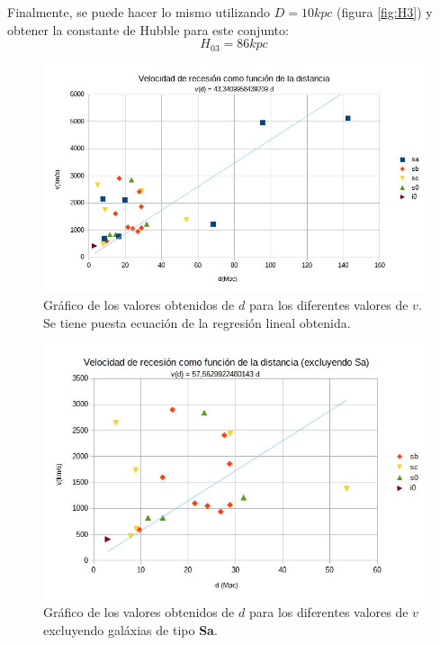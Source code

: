 \documentclass[a4paper,12pt]{article}
\begin{document}
Finalmente, se puede hacer lo mismo utilizando $D=10kpc$ (figura \ref{fig:H3}) y obtener la constante de Hubble para
este conjunto:
$$H_{03} = 86 kpc$$

\begin{figure}[H]
    \includegraphics[width=\textwidth]{g1.jpg}
    \caption{Gráfico de los valores obtenidos de $d$ para los diferentes valores de $v$. Se tiene puesta ecuación de la regresión lineal obtenida.}    
    \label{fig:H1}
\end{figure}

\begin{figure}[H]
    \includegraphics[width=\textwidth]{g2.jpg} 
    \caption{Gráfico de los valores obtenidos de $d$ para los diferentes valores de $v$ excluyendo galáxias de tipo \textbf{Sa}.}    
    \label{fig:H2}
\end{figure}
\end{document}
